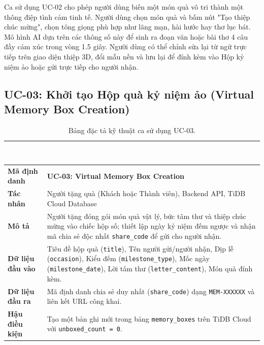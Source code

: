 Ca sử dụng UC-02 cho phép người dùng biến một món quà vô tri thành một thông điệp tình cảm tinh tế. Người dùng chọn món quà và bấm nút "Tạo thiệp chúc mừng", chọn tông giọng phù hợp như lãng mạn, hài hước hay thơ lục bát. Mô hình AI dựa trên các thông số này để sinh ra đoạn văn hoặc bài thơ 4 câu đầy cảm xúc trong vòng 1.5 giây. Người dùng có thể chỉnh sửa lại từ ngữ trực tiếp trên giao diện thiệp 3D, đổi mẫu nền và lưu lại để đính kèm vào Hộp kỷ niệm ảo hoặc gửi trực tiếp cho người nhận.

\subsection{UC-03: Khởi tạo Hộp quà kỷ niệm ảo (Virtual Memory Box Creation)}

\begin{table}[htbp]
\centering
\caption{Bảng đặc tả kỹ thuật ca sử dụng UC-03.}
\label{tab:spec_uc03}
\small
\renewcommand{\arraystretch}{1.2}
\begin{tabularx}{\textwidth}{|p{3.2cm}|X|}
\hline
\rowcolor{PrimaryBlue}
\textcolor{white}{\textbf{Thuộc tính}} & \textcolor{white}{\textbf{Nội dung đặc tả chi tiết}} \\
\hline
\textbf{Mã định danh} & \textbf{UC-03: Virtual Memory Box Creation} \\
\hline
\textbf{Tác nhân} & Người tặng quà (Khách hoặc Thành viên), Backend API, TiDB Cloud Database \\
\hline
\textbf{Mô tả} & Người tặng đóng gói món quà vật lý, bức tâm thư và thiệp chúc mừng vào chiếc hộp số; thiết lập ngày kỷ niệm đếm ngược và nhận mã chia sẻ độc nhất \texttt{share\_code} để gửi cho người nhận. \\
\hline
\textbf{Dữ liệu đầu vào} & Tiêu đề hộp quà (\texttt{title}), Tên người gửi/người nhận, Dịp lễ (\texttt{occasion}), Kiểu đếm (\texttt{milestone\_type}), Mốc ngày (\texttt{milestone\_date}), Lời tâm thư (\texttt{letter\_content}), Món quà đính kèm. \\
\hline
\textbf{Dữ liệu đầu ra} & Mã định danh chia sẻ duy nhất (\texttt{share\_code}) dạng \texttt{MEM-XXXXXX} và liên kết URL công khai. \\
\hline
\textbf{Hậu điều kiện} & Tạo một bản ghi mới trong bảng \texttt{memory\_boxes} trên TiDB Cloud với \texttt{unboxed\_count = 0}. \\
\hline
\end{tabularx}
\end{table}

